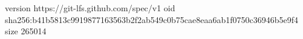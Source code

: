 version https://git-lfs.github.com/spec/v1
oid sha256:b41b5813c9919877163563b2f2ab549c0b75cae8eaa6ab1f0750c36946b5e9f4
size 265014
